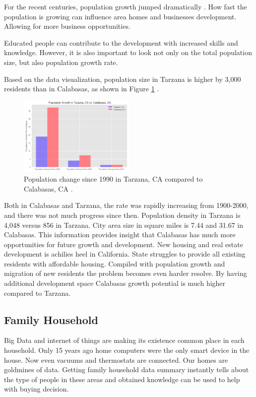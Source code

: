 \documentclass[sigconf]{acmart}
\begin{document}
For the recent centuries, population growth jumped dramatically \cite{population}. How fast the population is growing can influence area homes and businesses development. Allowing for more business opportunities.   

Educated people can contribute to the development with increased skills and knowledge. However, it is also important to look not only on the total population size, but also population growth rate.

Based on the data visualization, population size in Tarzana is higher by 3,000 residents than in Calabasas, as shown in Figure \ref{fig:figure6} \cite{md}.

\begin{figure}
  \centering
  \includegraphics[width=0.5\textwidth]{images/figure6.png}
  \caption{Population change since 1990 in Tarzana, CA compared to Calabasas, CA  \cite{md}.} \label{fig:figure6} 
\end{figure}

Both in Calabasas and Tarzana, the rate was rapidly increasing from 1900-2000, and there was not much progress since then. Population density in Tarzana is  4,048 versus 856 in Tarzana. City area size in square miles is 7.44 and 31.67 in Calabasas. 
This information provides insight that Calabasas has much more opportunities for future growth and development. New housing and real estate development is achilies heel in California.  State struggles to provide all existing residents with affordable housing. Compiled with population growth and migration of new residents the problem becomes even harder resolve.  By having additional development space  Calabasas growth potential is much higher compared to Tarzana.

\subsection{Family Household}

Big Data and internet of things are making its existence common place in each household. Only 15 years ago home computers were the only smart device in the house.  Now even vacuums and thermostats are connected. Our homes are goldmines of data.  Getting family household data summary instantly tells about the type of people in these areas and obtained knowledge can be used to help with buying decision.
\end{document}

